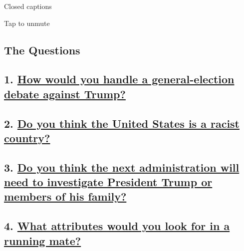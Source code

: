 Closed captions

Tap to unmute

\hypertarget{the-questions}{%
\subsection{The Questions}\label{the-questions}}

\hypertarget{1-how-would-you-handle-a-general-election-debate-against-trump}{%
\subsection{\texorpdfstring{1.
\href{https://www.nytimes.com/interactive/2020/us/politics/trump-debate-20-questions.html}{How
would you handle a general-election debate against
Trump?}}{1. How would you handle a general-election debate against Trump?}}\label{1-how-would-you-handle-a-general-election-debate-against-trump}}

\hypertarget{2-do-you-think-the-united-states-is-a-racist-country}{%
\subsection{\texorpdfstring{2.
\href{https://www.nytimes.com/interactive/2020/us/politics/racism-in-america-20-questions.html}{Do
you think the United States is a racist
country?}}{2. Do you think the United States is a racist country?}}\label{2-do-you-think-the-united-states-is-a-racist-country}}

\hypertarget{3-do-you-think-the-next-administration-will-need-to-investigate-president-trump-or-members-of-his-family}{%
\subsection{\texorpdfstring{3.
\href{https://www.nytimes.com/interactive/2020/us/politics/trump-investigation-20-questions.html}{Do
you think the next administration will need to investigate President
Trump or members of his
family?}}{3. Do you think the next administration will need to investigate President Trump or members of his family?}}\label{3-do-you-think-the-next-administration-will-need-to-investigate-president-trump-or-members-of-his-family}}

\hypertarget{4-what-attributes-would-you-look-for-in-a-running-mate}{%
\subsection{\texorpdfstring{4.
\href{https://www.nytimes.com/interactive/2020/us/politics/vice-president-20-questions.html}{What
attributes would you look for in a running
mate?}}{4. What attributes would you look for in a running mate?}}\label{4-what-attributes-would-you-look-for-in-a-running-mate}}

